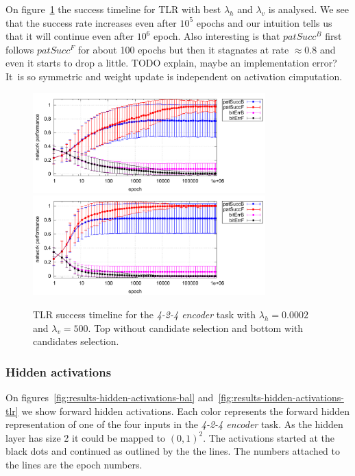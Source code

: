 On figure~\ref{fig:results-tlr-auto4-epoch} the success timeline for TLR with best $\lambda_h$ and $\lambda_v$ is analysed. We see that the success rate increases even after $10^5$ epochs and our intuition tells us that it will continue even after $10^6$ epoch. Also interesting is that $patSucc^B$ first follows $patSucc^F$ for about 100 epochs but then it stagnates at rate $\approx0.8$ and even it starts to drop a little. TODO explain, maybe an implementation error? It~is so symmetric and weight update is independent on activation cimputation. 

\begin{figure}[H]
  \centering
  \includegraphics[width=0.8\textwidth]{img/tlr-auto4-best-perf.pdf}\\
  \includegraphics[width=0.8\textwidth]{img/tlr-auto4-best-can.pdf}      
  \caption{TLR success timeline for the \emph{4-2-4 encoder} task with $\lambda_h=0.0002$ and $\lambda_v=500$. Top without candidate selection and bottom with candidates selection.}
  \label{fig:results-tlr-auto4-epoch} 
\end{figure}

\subsubsection{Hidden activations} 
\label{sec:tlr-auto4-hidden}

On figures~\ref{fig:results-hidden-activations-bal} and~\ref{fig:results-hidden-activations-tlr} we show forward hidden activations. Each color represents the forward hidden representation of one of the four inputs in the \emph{4-2-4 encoder} task. As the hidden layer has size 2 it could be mapped to $(0,1)^2$. The activations started at the black dots and continued as outlined by the the lines. The numbers attached to the lines are the epoch numbers. 

